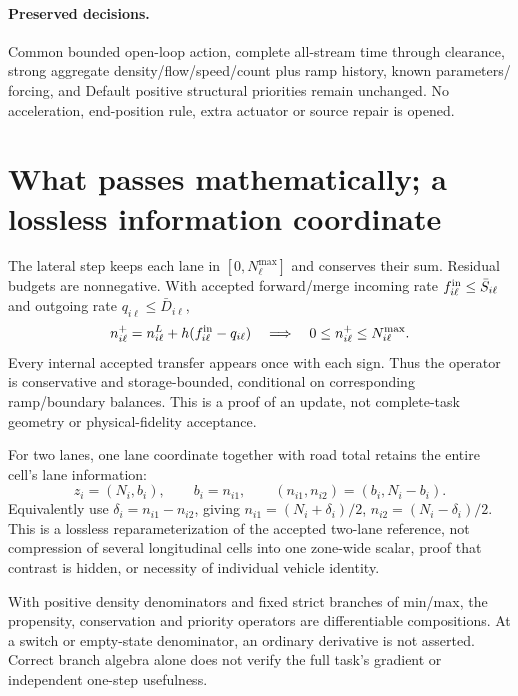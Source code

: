 \documentclass[10pt,a4paper]{article}
\begin{document}
\paragraph{Preserved decisions.}
Common bounded open-loop action, complete all-stream time through clearance,
strong aggregate density/flow/speed/count plus ramp history, known parameters/
forcing, and Default positive structural priorities remain unchanged. No
acceleration, end-position rule, extra actuator or source repair is opened.
\newpage

\section{What passes mathematically; a lossless information coordinate}
The lateral step keeps each lane in $[0,N^{\max}_\ell]$ and conserves their sum.
Residual budgets are nonnegative. With accepted forward/merge incoming rate
$f^{\rm in}_{i\ell}\leq\bar S_{i\ell}$ and outgoing rate
$q_{i\ell}\leq\bar D_{i\ell}$,
\begin{equation}
 n^+_{i\ell}=n^L_{i\ell}+h(f^{\rm in}_{i\ell}-q_{i\ell})
 \quad\Longrightarrow\quad 0\leq n^+_{i\ell}\leq N^{\max}_{i\ell}.
\end{equation}
Every internal accepted transfer appears once with each sign. Thus the
operator is conservative and storage-bounded, conditional on corresponding
ramp/boundary balances. This is a proof of an update, not complete-task geometry
or physical-fidelity acceptance.

For two lanes, one lane coordinate together with road total retains the entire
cell's lane information:
\begin{equation}
 z_i=(N_i,b_i),\qquad b_i=n_{i1},\qquad
 (n_{i1},n_{i2})=(b_i,N_i-b_i).
\end{equation}
Equivalently use $\delta_i=n_{i1}-n_{i2}$, giving
$n_{i1}=(N_i+\delta_i)/2$, $n_{i2}=(N_i-\delta_i)/2$.
This is a lossless reparameterization of the accepted two-lane reference,
not compression of several longitudinal cells into one zone-wide scalar,
proof that contrast is hidden, or necessity of individual vehicle identity.

With positive density denominators and fixed strict branches of min/max,
the propensity, conservation and priority operators are differentiable
compositions. At a switch or empty-state denominator, an ordinary derivative
is not asserted. Correct branch algebra alone does not verify the full task's
gradient or independent one-step usefulness.
\end{document}
